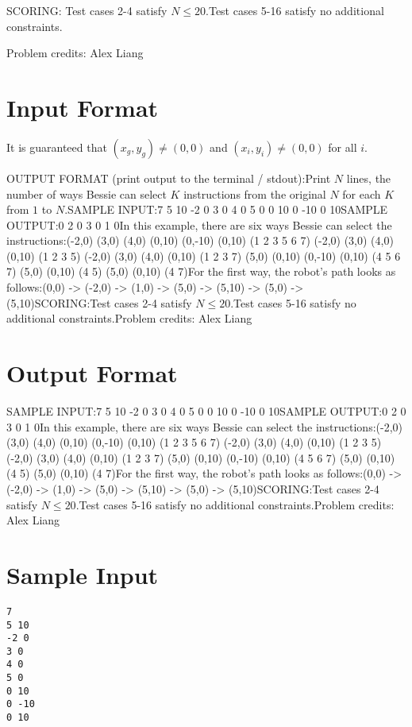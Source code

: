 \documentclass[12pt]{article}
\begin{document}
SCORING:
Test cases 2-4 satisfy $N\le 20$.Test cases 5-16 satisfy no additional constraints.


Problem credits: Alex Liang



\section*{Input Format}
It is guaranteed that $(x_g,y_g)\neq (0,0)$ and $(x_i,y_i)\neq (0,0)$ for all
$i$.

OUTPUT FORMAT (print output to the terminal / stdout):Print $N$ lines, the number of ways Bessie can select $K$ instructions from the
original $N$ for each $K$ from $1$ to $N$.SAMPLE INPUT:7
5 10
-2 0
3 0
4 0
5 0
0 10
0 -10
0 10SAMPLE OUTPUT:0
2
0
3
0
1
0In this example, there are six ways Bessie can select the instructions:(-2,0) (3,0) (4,0) (0,10) (0,-10) (0,10) (1 2 3 5 6 7)
(-2,0) (3,0) (4,0) (0,10) (1 2 3 5)
(-2,0) (3,0) (4,0) (0,10) (1 2 3 7)
(5,0) (0,10) (0,-10) (0,10) (4 5 6 7)
(5,0) (0,10) (4 5)
(5,0) (0,10) (4 7)For the first way, the robot's path looks as follows:(0,0) -> (-2,0) -> (1,0) -> (5,0) -> (5,10) -> (5,0) -> (5,10)SCORING:Test cases 2-4 satisfy $N\le 20$.Test cases 5-16 satisfy no additional constraints.Problem credits: Alex Liang

\section*{Output Format}
SAMPLE INPUT:7
5 10
-2 0
3 0
4 0
5 0
0 10
0 -10
0 10SAMPLE OUTPUT:0
2
0
3
0
1
0In this example, there are six ways Bessie can select the instructions:(-2,0) (3,0) (4,0) (0,10) (0,-10) (0,10) (1 2 3 5 6 7)
(-2,0) (3,0) (4,0) (0,10) (1 2 3 5)
(-2,0) (3,0) (4,0) (0,10) (1 2 3 7)
(5,0) (0,10) (0,-10) (0,10) (4 5 6 7)
(5,0) (0,10) (4 5)
(5,0) (0,10) (4 7)For the first way, the robot's path looks as follows:(0,0) -> (-2,0) -> (1,0) -> (5,0) -> (5,10) -> (5,0) -> (5,10)SCORING:Test cases 2-4 satisfy $N\le 20$.Test cases 5-16 satisfy no additional constraints.Problem credits: Alex Liang

\section*{Sample Input}
\begin{verbatim}
7
5 10
-2 0
3 0
4 0
5 0
0 10
0 -10
0 10
\end{verbatim}
\end{document}
